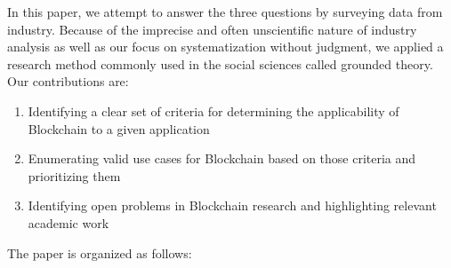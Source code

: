 In this paper, we attempt to answer the three questions by surveying data from industry. Because of the imprecise and often unscientific nature of industry analysis as well as our focus on systematization without judgment, we applied a research method commonly used in the social sciences called grounded theory. Our contributions are:
\begin{enumerate}
	\item Identifying a clear set of criteria for determining the applicability of Blockchain to a given application
	\item Enumerating valid use cases for Blockchain based on those criteria and prioritizing them
	\item Identifying open problems in Blockchain research and highlighting relevant academic work
\end{enumerate}

The paper is organized as follows: 